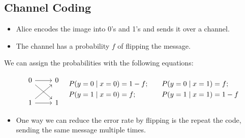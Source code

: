 \subsection{Channel Coding}


\begin{itemize}
    \item Alice encodes the image into 0's and 1's and sends it over a channel.
    \item The channel has a probability \( f \) of flipping the message.
\end{itemize}



We can assign the probabilities with the following equations: 


\[
    \begin{tikzcd}[row sep=normal, column sep=normal]
        0 \arrow[r, ""] \arrow[dr, ""] & 0 \\
        1 \arrow[r, ""] \arrow[ur, ""] & 1
    \end{tikzcd}
    \quad
    \begin{aligned}
        P(y=0 \mid x=0) & = 1 - f; \quad & P(y=0 \mid x=1) & = f;    \\
        P(y=1 \mid x=0) & = f; \quad     & P(y=1 \mid x=1) & = 1 - f
    \end{aligned}
\]


\begin{itemize}
    \item One way we can reduce the error rate by flipping is the repeat the code, sending the same message multiple times.
\end{itemize}


